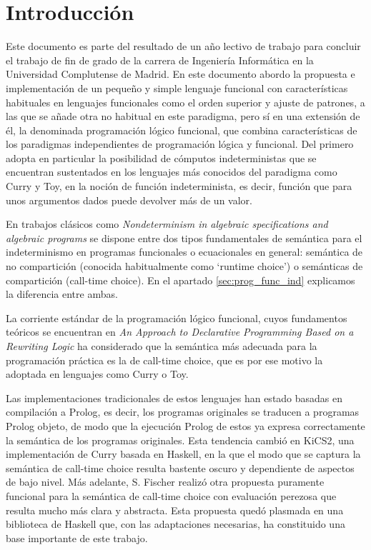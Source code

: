 \documentclass[class=article, crop=false]{standalone}
\begin{document}
\section{Introducción}
Este documento es parte del resultado de un año lectivo de trabajo para concluir el trabajo
de fin de grado de la carrera de Ingeniería Informática en la Universidad Complutense de
Madrid. En este documento abordo la propuesta e implementación de un pequeño y simple
lenguaje funcional con características habituales en lenguajes funcionales como el orden
superior y ajuste de patrones, a las que se añade otra no habitual en este paradigma, pero sí
en una extensión de él, la denominada programación lógico
funcional\cite{antoy2010functional}, que combina características de los paradigmas
independientes de programación lógica y funcional. Del primero adopta en particular la
posibilidad de cómputos indeterministas que se encuentran sustentados en los lenguajes más
conocidos del paradigma como Curry\cite{Hanus16Curry} y Toy\cite{fraguas1999toy}, en la
noción de función indeterminista, es decir, función que para unos argumentos dados puede
devolver más de un valor.

En trabajos clásicos como \textit{Nondeterminism in algebraic specifications and algebraic
programs}\cite{hussmann1993nondeterminism} se dispone entre dos tipos fundamentales de
semántica para el indeterminismo en programas funcionales o ecuacionales en general:
semántica de no compartición (conocida habitualmente como `runtime choice') o semánticas de
compartición (call-time choice). En el apartado \ref{sec:prog_func_ind} explicamos la
diferencia entre ambas.

La corriente estándar de la programación lógico funcional, cuyos fundamentos teóricos se
encuentran en \textit{An Approach to Declarative Programming Based on a Rewriting Logic
}\cite{DBLP:journals/jlp/Gonzalez-MorenoHLR99} ha considerado que la semántica más adecuada
para la programación práctica es la de call-time choice, que es por ese motivo la adoptada en
lenguajes como Curry o Toy.

Las implementaciones tradicionales de estos lenguajes han estado basadas en compilación a
Prolog\cite{deransart2012prolog}, es decir, los programas originales se traducen a programas
Prolog objeto, de modo que la ejecución Prolog de estos ya expresa correctamente la semántica
de los programas originales. Esta tendencia cambió en
KiCS2\cite{BrasselHanusPeemoellerReck11}, una implementación de Curry basada en Haskell, en
la que el modo que se captura la semántica de call-time choice resulta bastente oscuro y
dependiente de aspectos de bajo nivel. Más adelante, S. Fischer realizó otra propuesta
puramente funcional para la semántica de call-time choice con evaluación
perezosa\cite{fischer2011purely} que resulta mucho más clara y abstracta. Esta propuesta
quedó plasmada en una biblioteca de Haskell que, con las adaptaciones necesarias, ha
constituido una base importante de este trabajo.
\end{document}
